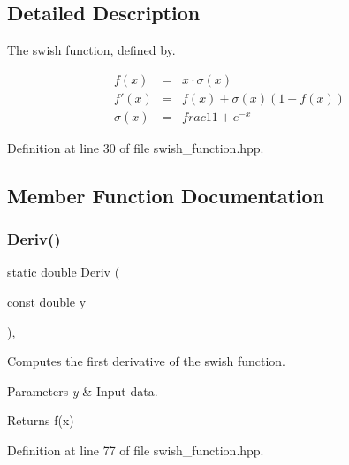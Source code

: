 \subsection{Detailed Description}
The swish function, defined by. 

\begin{eqnarray*} f(x) &=& x \cdot \sigma(x) \\ f'(x) &=& f(x) + \sigma(x) (1 - f(x)) \\ \sigma(x) &=& frac{1}{1 + e^{-x}} \end{eqnarray*} 

Definition at line 30 of file swish\+\_\+function.\+hpp.



\subsection{Member Function Documentation}
\mbox{\label{classmlpack_1_1ann_1_1SwishFunction_a163d34fd09f8edf457164f5033c635cf}} 
\subsubsection{Deriv()\hspace{0.1cm}{\footnotesize\ttfamily [1/2]}}
{\footnotesize\ttfamily static double Deriv (\begin{DoxyParamCaption}\item[{const double}]{y }\end{DoxyParamCaption})\hspace{0.3cm}{\ttfamily [inline]}, {\ttfamily [static]}}



Computes the first derivative of the swish function. 


\begin{DoxyParams}{Parameters}
{\em y} & Input data. \\
\hline
\end{DoxyParams}
\begin{DoxyReturn}{Returns}
f\textquotesingle{}(x) 
\end{DoxyReturn}


Definition at line 77 of file swish\+\_\+function.\+hpp.

\mbox{\label{classmlpack_1_1ann_1_1SwishFunction_ad442502c34b67303b74c735641dab790}} 
